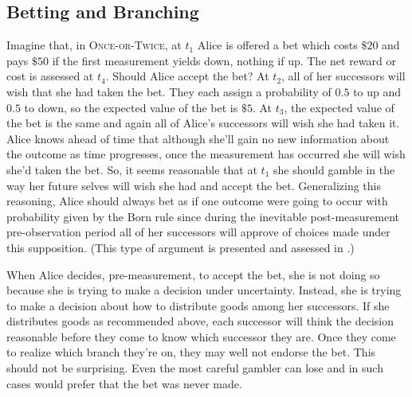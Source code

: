 \documentclass[onecolumn,secnumarabic,amsmath,amssymb,balancelastpage,nofootinbib]{article}
\begin{document}
\subsection{Betting and Branching}\label{betandbranch}

Imagine that, in \textsc{Once-or-Twice}, at $t_1$ Alice is offered a bet which costs $\$20$ and pays $\$50$ if the {first measurement yields} down, nothing if up. The net reward or cost is assessed at $t_4$.  Should Alice accept the bet?  At $t_2$, all of her successors will wish that she had taken the bet.  They each assign a probability of $0.5$ to up and $0.5$ to down, so the expected value of the bet is $\$5$.  At $t_3$, the expected value of the bet is the same and again all of Alice's successors will wish she had taken it.  Alice knows ahead of time that although she'll gain no new information about the outcome as time progresses, once the measurement has occurred she will wish she'd taken the bet.  So, it seems reasonable that at $t_1$ she should {gamble} in the way her future selves will wish she had and accept the bet. Generalizing this reasoning, Alice should {always} bet as if one outcome were going to occur with probability given by the Born rule since during the inevitable post-measurement pre-observation period all of her successors will approve of choices made under this supposition. (This type of argument is presented and assessed in \citealp[][]{tappenden2011}.)

When Alice decides, pre-measurement, to accept the bet, she is not doing so because she is trying to make a decision under uncertainty.  Instead, she is trying to make a decision about how to distribute goods among her successors.  If she distributes goods as recommended above, each successor will think the decision reasonable before they come to know which successor they are.  Once they come to realize which branch they're on, they may well not endorse the bet.  This should not be surprising.  Even the most careful gambler can lose and in such cases would prefer that the bet was never made.
\end{document}
